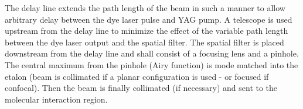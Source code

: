 The delay line extends the path length of the beam in such a manner to allow arbitrary delay between the dye laser pulse and YAG pump. A telescope is used upstream from the delay line to minimize the effect of the variable path length between the dye laser output and the spatial filter. The spatial filter is placed downstream from the delay line and shall consist of a focusing lens and a pinhole. The central maximum from the pinhole (Airy function) is mode matched into the etalon (beam is collimated if a planar configuration is used - or focused if confocal). Then the beam is finally collimated (if necessary) and sent to the molecular interaction region.
